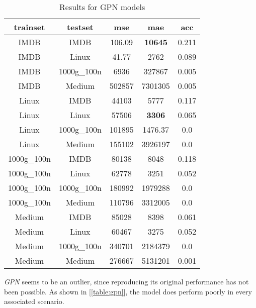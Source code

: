 \documentclass[../Thesis.tex]{subfiles}
\begin{document}
	\begin{table}[H]
		\centering
		\setlength\tabcolsep{4pt}
		\renewcommand{\arraystretch}{1.2}
		\begin{tabular}{c|c|c|c|c}
			\toprule
			\textbf{trainset} & \textbf{testset} & \textbf{mse} & \textbf{mae} & \textbf{acc} \\
			\midrule
			IMDB & IMDB & 106.09 & \textbf{10645} & 0.211 \\
			IMDB & Linux & 41.77 & 2762 & 0.089 \\
			IMDB & 1000g\_100n & 6936 & 327867 & 0.005 \\
			IMDB & Medium & 502857 & 7301305 & 0.005 \\ \midrule
			Linux & IMDB & 44103 & 5777 & 0.117 \\
			Linux & Linux & 57506 & \textbf{3306} & 0.065 \\
			Linux & 1000g\_100n & 101895 & 1476.37 & 0.0 \\
			Linux & Medium & 155102 & 3926197 & 0.0 \\ \midrule
			1000g\_100n & IMDB & 80138 & 8048 & 0.118 \\
			1000g\_100n & Linux & 62778 & 3251 & 0.052 \\
			1000g\_100n & 1000g\_100n & 180992 & 1979288 & 0.0 \\
			1000g\_100n & Medium & 110796 & 3312005 & 0.0 \\ \midrule
			Medium & IMDB & 85028 & 8398 & 0.061 \\
			Medium & Linux & 60467 & 3275 & 0.052 \\
			Medium & 1000g\_100n & 340701 & 2184379 & 0.0 \\
			Medium & Medium & 276667 & 5131201 & 0.001 \\
			\bottomrule
		\end{tabular}
		\caption{Results for GPN models}
		\label{table:gpn}
	\end{table}
	
	\emph{GPN} seems to be an outlier, since reproducing its original performance has not been possible. As shown in [\autoref{table:gpn}], the model does perform poorly in every associated scenario.
	
\end{document}
